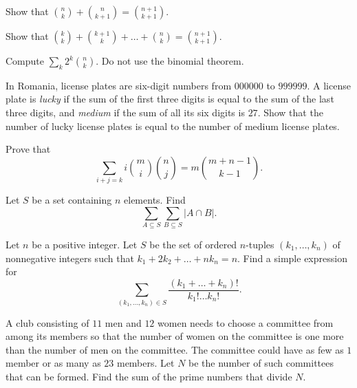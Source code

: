 \documentclass[11pt]{scrartcl}
\begin{document}
\begin{problem}
	Show that $\binom nk + \binom n{k + 1} = \binom{n + 1}{k + 1}$.
\end{problem}

\begin{problem}
	Show that $\binom kk + \binom{k + 1}k + \dots + \binom nk = \binom{n + 1}{k + 1}$.
\end{problem}

\begin{problem}
	Compute $\sum_k2^k\binom nk$. Do not use the binomial theorem.
\end{problem}

\begin{problem}
	In Romania, license plates are six-digit numbers from $000000$ to $999999$. A license plate is \emph{lucky} if the sum of the first three digits is equal to the sum of the last three digits, and \emph{medium} if the sum of all its six digits is $27$. Show that the number of lucky license plates is equal to the number of medium license plates.
\end{problem}

\begin{problem}
	Prove that
	\[\sum_{i + j = k}i\binom mi\binom nj = m\binom{m + n - 1}{k - 1}.\]
\end{problem}

\begin{problem}
	Let $S$ be a set containing $n$ elements. Find
	\[\sum_{A \subseteq S}\sum_{B \subseteq S}\lvert A \cap B\rvert.\]
\end{problem}

\begin{problem}
	Let $n$ be a positive integer. Let $S$ be the set of ordered $n$-tuples $(k_1,\dots,k_n)$ of nonnegative integers such that $k_1 + 2k_2 + \dots + nk_n = n$. Find a simple expression for
	\[\sum_{(k_1,\dots,k_n) \in S}\frac{(k_1 + \dots + k_n)!}{k_1!\dots k_n!}.\]
\end{problem}

\begin{problem}[AIME I 2020/7]
	A club consisting of $11$ men and $12$ women needs to choose a committee from among its members so that the number of women on the committee is one more than the number of men on the committee. The committee could have as few as $1$ member or as many as $23$ members. Let $N$ be the number of such committees that can be formed. Find the sum of the prime numbers that divide $N$.
\end{problem}
\end{document}

